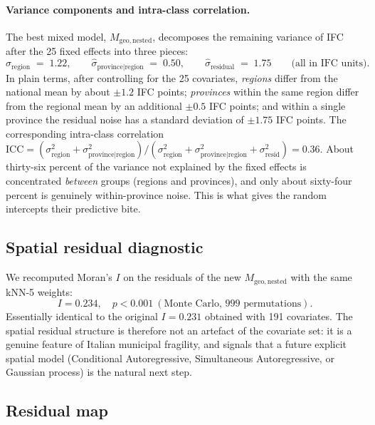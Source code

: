 \documentclass[11pt,a4paper]{article}
\begin{document}
\paragraph{Variance components and intra-class correlation.}
The best mixed model, $M_{\mathrm{geo,nested}}$, decomposes the
remaining variance of IFC after the 25 fixed effects into three
pieces:
\begin{equation}
  \widehat\sigma_{\text{region}} \;=\; 1.22, \qquad
  \widehat\sigma_{\text{province}|\text{region}} \;=\; 0.50, \qquad
  \widehat\sigma_{\text{residual}} \;=\; 1.75
  \qquad \text{(all in IFC units).}
  \label{eq:varcomp}
\end{equation}
In plain terms, after controlling for the 25 covariates,
\emph{regions} differ from the national mean by about $\pm 1.2$ IFC
points; \emph{provinces} within the same region differ from the
regional mean by an additional $\pm 0.5$ IFC points; and within a
single province the residual noise has a standard deviation of
$\pm 1.75$ IFC points. The corresponding intra-class correlation
$\mathrm{ICC} = (\sigma^2_{\text{region}} +
\sigma^2_{\text{province}|\text{region}}) /
(\sigma^2_{\text{region}} + \sigma^2_{\text{province}|\text{region}}
+ \sigma^2_{\text{resid}}) = 0.36$. About thirty-six percent of the
variance not explained by the fixed effects is concentrated
\emph{between} groups (regions and provinces), and only about
sixty-four percent is genuinely within-province noise. This is what
gives the random intercepts their predictive bite.

\subsection{Spatial residual diagnostic}

We recomputed Moran's $I$ on the residuals of the new
$M_{\mathrm{geo,nested}}$ with the same kNN-5 weights:
\begin{equation*}
  I = 0.234, \quad p < 0.001\ (\text{Monte Carlo, 999 permutations}).
\end{equation*}
Essentially identical to the original $I = 0.231$ obtained with 191
covariates. The spatial residual structure is therefore not an
artefact of the covariate set: it is a genuine feature of Italian
municipal fragility, and signals that a future explicit spatial
model (Conditional Autoregressive, Simultaneous Autoregressive,
or Gaussian process) is the natural next step.

\subsection{Residual map}
\end{document}
